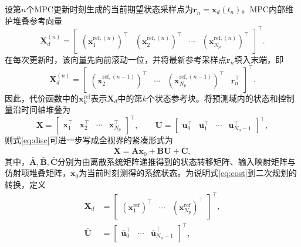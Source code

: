 ﻿\documentclass[preprint,12pt]{elsarticle}
\begin{document}
设第$n$个MPC更新时刻生成的当前期望状态采样点为$\bm r_n=\bm x_d(t_n)$。MPC内部维护堆叠参考向量
\begin{equation}
\bm X_d^{(n)}
=
\begin{bmatrix}
(\bm x_{1}^{\text{ref},(n)})^\top &
(\bm x_{2}^{\text{ref},(n)})^\top &
\cdots &
(\bm x_{N_p}^{\text{ref},(n)})^\top
\end{bmatrix}^{\top}.
\label{eq:rolling_ref}
\end{equation}
在每次更新时，该向量先向前滚动一位，并将最新参考采样点$\bm r_n$填入末端，即
\begin{equation}
\bm X_d^{(n)}
=
\begin{bmatrix}
(\bm x_{2}^{\text{ref},(n-1)})^\top &
\cdots &
(\bm x_{N_p}^{\text{ref},(n-1)})^\top &
\bm r_n^\top
\end{bmatrix}^{\top}.
\label{eq:rolling_ref_update}
\end{equation}
因此，代价函数中的$\bm x_k^{\text{ref}}$表示$\bm X_d$中的第$k$个状态参考块。将预测域内的状态和控制量沿时间轴堆叠为
\begin{equation}
\bm X=
\begin{bmatrix}
\bm x_1^\top & \bm x_2^\top & \cdots & \bm x_{N_p}^\top
\end{bmatrix}^\top,\qquad
\bm U=
\begin{bmatrix}
\bm u_0^\top & \bm u_1^\top & \cdots & \bm u_{N_u-1}^\top
\end{bmatrix}^\top,
\label{eq:stack}
\end{equation}
则式\eqref{eq:disc}可进一步写成全视界的紧凑形式为\begin{equation}
\bm X=\bar{\bm A}\bm x_0+\bar{\bm B}\bm U+\bar{\bm C},
\label{eq:predcompact}
\end{equation}
其中，$\bar{\bm A},\bar{\bm B},\bar{\bm C}$分别为由离散系统矩阵递推得到的状态转移矩阵、输入映射矩阵与仿射项堆叠矩阵，$\bm x_0$为当前时刻测得的系统状态。为说明式\eqref{eq:cost}到二次规划的转换，定义
\begin{equation}
\begin{aligned}
\bm X_d&=\begin{bmatrix}(\bm x_1^{\text{ref}})^\top&\cdots&(\bm x_{N_p}^{\text{ref}})^\top\end{bmatrix}^{\top},\\
\bar{\bm U}&=\begin{bmatrix}\bar{\bm u}_0^\top&\cdots&\bar{\bm u}_{N_u-1}^\top\end{bmatrix}^{\top},
\end{aligned}
\label{eq:stacked_ref_input}
\end{equation}
\end{document}

